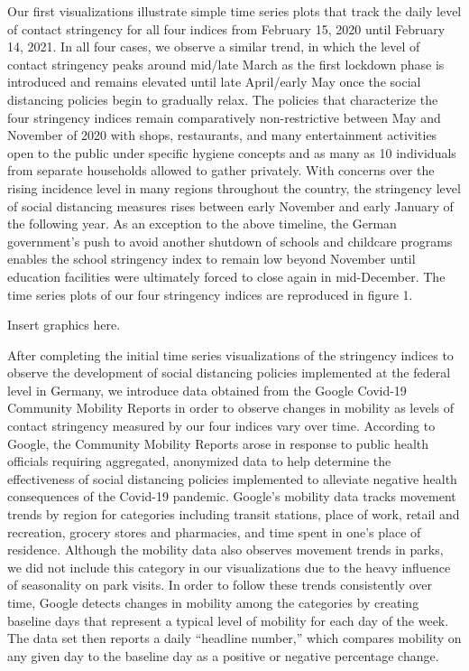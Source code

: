 Our first visualizations illustrate simple time series plots that track the daily level of contact stringency for all four indices from February 15, 2020 until February 14, 2021. In all four cases, we observe a similar trend, in which the level of contact stringency peaks around mid/late March as the first lockdown phase is introduced and remains elevated until late April/early May once the social distancing policies begin to gradually relax. The policies that characterize the four stringency indices remain comparatively non-restrictive between May and November of 2020 with shops, restaurants, and many entertainment activities open to the public under specific hygiene concepts and as many as 10 individuals from separate households allowed to gather privately. With concerns over the rising incidence level in many regions throughout the country, the stringency level of social distancing measures rises between early November and early January of the following year. As an exception to the above timeline, the German government’s push to avoid another shutdown of schools and childcare programs enables the school stringency index to remain low beyond November until education facilities were ultimately forced to close again in mid-December. The time series plots of our four stringency indices are reproduced in figure 1.  

Insert graphics here. 

After completing the initial time series visualizations of the stringency indices to observe the development of social distancing policies implemented at the federal level in Germany, we introduce data obtained from the Google Covid-19 Community Mobility Reports in order to observe changes in mobility as levels of contact stringency measured by our four indices vary over time. According to Google, the Community Mobility Reports arose in response to public health officials requiring aggregated, anonymized data to help determine the effectiveness of social distancing policies implemented to alleviate negative health consequences of the Covid-19 pandemic. Google’s mobility data tracks movement trends by region for categories including transit stations, place of work, retail and recreation, grocery stores and pharmacies, and time spent in one’s place of residence. Although the mobility data also observes movement trends in parks, we did not include this category in our visualizations due to the heavy influence of seasonality on park visits. In order to follow these trends consistently over time, Google detects changes in mobility among the categories by creating baseline days that represent a typical level of mobility for each day of the week. The data set then reports a daily “headline number,” which compares mobility on any given day to the baseline day as a positive or negative percentage change. 

